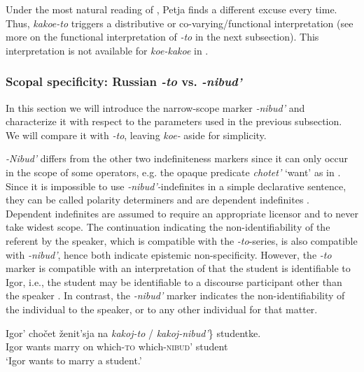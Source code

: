 \documentclass[output=paper,colorlinks,citecolor=brown]{langscibook}
\begin{document}
\noindent Under the most natural reading of , Petja finds a different excuse every time. Thus, \textit{kakoe-to} triggers a distributive or co-varying/functional interpretation (see more on the functional interpretation of \textit{-to} in the next subsection). This interpretation is not available for \textit{koe-kakoe} in . 

\subsubsection{Scopal specificity: Russian \textit{-to} vs. \textit{-nibud'}}

In this section we will introduce the narrow-scope marker \textit{-nibud’} and characterize it with respect to the parameters used in the previous subsection. We will compare it with \textit{-to}, leaving \textit{koe-} aside for simplicity. 


\textit{-Nibud’} differs from the other two indefiniteness markers since it can only occur in the scope of some operators, e.g. the opaque predicate \textit{chotet’} ‘want’ as in . Since it is impossible to use \textit{-nibud’-}indefinites in a simple declarative sentence, they can be called polarity determiners \citep{Pereltsvaig2000} and are dependent indefinites \citep{Farkas1997,Farkas2002,Brasoveanu.Farkas2011}. Dependent indefinites are assumed to require an appropriate licensor and to never take widest scope. The continuation indicating the non-identifiability of the referent by the speaker, which is compatible with the \textit{-to}-series, is also compatible with \textit{-nibud’}, hence both indicate epistemic non-specificity. However, the \textit{-to} marker is compatible with an interpretation of  that the student is identifiable to Igor, i.e., the student may be identifiable to a discourse participant other than the speaker \citep{Kagan2011}. In contrast, the \textit{-nibud’} marker indicates the non-identifiability of the individual to the speaker, or to any other individual for that matter.

\ea\label{geist:ex:to-nibud1}
\gll Igor’ chočet ženit’sja na \minsp{\{} \textit{kakoj-to} / \textit{kakoj-nibud’}\} studentke.\\
Igor wants marry on {} which-\textsc{to} {} which-\textsc{nibud'} student\\
\glt ‘Igor wants to marry a student.’\hfill \citep[155]{Geist2008}
\z
\end{document}
